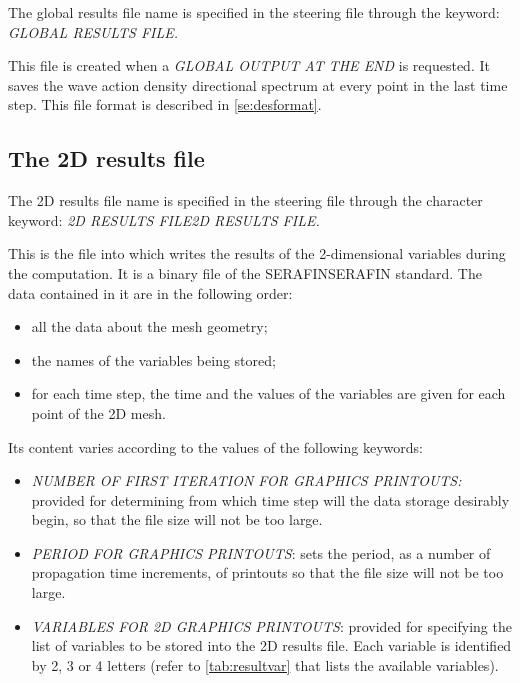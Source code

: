  The global results file name is specified in the steering file through the keyword: \textit{GLOBAL RESULTS FILE.}

 This file is created when a \textit{GLOBAL OUTPUT AT THE END} is requested. It saves the wave action density directional spectrum at every point in the last time step. This file format is described in \ref{se:desformat}.


\subsection{ The 2D results file }

 The 2D results file name is specified in the steering file through the character keyword: \textit{2D RESULTS FILE2D RESULTS FILE.}

 This is the file into which \tomawac writes the results of the 2-dimensional variables during the computation. It is a binary file of the SERAFINSERAFIN standard. The data contained in it are in the following order:

\begin{itemize}
\item  all the data about the mesh geometry;
\item  the names of the variables being stored;
\item  for each time step, the time and the values of the variables are given for each point of the 2D mesh.
\end{itemize}

 Its content varies according to the values of the following keywords:

\begin{itemize}
\item  \textit{NUMBER OF FIRST ITERATION FOR GRAPHICS PRINTOUTS:} provided for determining from which time step will the data storage desirably begin, so that the file size will not be too large.
\item  \textit{PERIOD FOR GRAPHICS PRINTOUTS}: sets the period, as a number of propagation time increments, of printouts so that the file size will not be too large.
\item  \textit{VARIABLES FOR 2D GRAPHICS PRINTOUTS}: provided for specifying the list of variables to be stored into the 2D results file. Each variable is identified by 2, 3 or 4 letters (refer to \ref{tab:resultvar} that lists the available variables).
\end{itemize}


